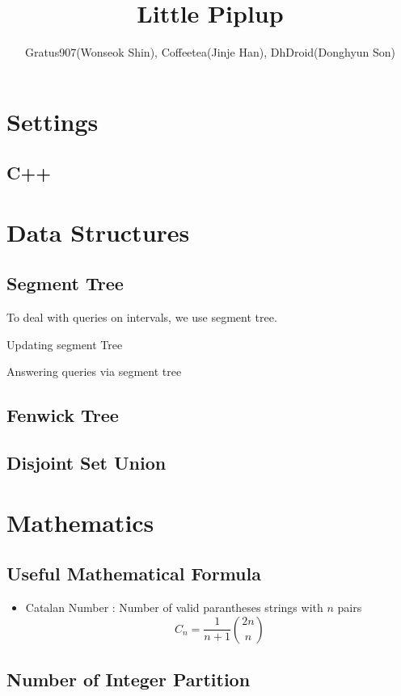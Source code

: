 \documentclass[landscape,8pt]{article}
\title{\Huge{\textsf{Little Piplup}}}
\author{Gratus907(Wonseok Shin), Coffeetea(Jinje Han), DhDroid(Donghyun Son)}
\date{ }
\begin{document}
\maketitle
\begin{multicols}{2}\raggedcolumns
\tableofcontents
\pagebreak

\section{Settings}

  \subsection{C++}

\section{Data Structures}
  \subsection{Segment Tree}
     To deal with queries on intervals, we use segment tree.
     
     Updating segment Tree
     
     Answering queries via segment tree
     
  \subsection{Fenwick Tree}
  \subsection{Disjoint Set Union}
\columnbreak
  \section{Mathematics}
  \subsection{Useful Mathematical Formula}
    \begin{itemize}
      \item Catalan Number : Number of valid parantheses strings with $n$ pairs
      \[
      C_n = \frac{1}{n+1}\binom{2n}{n}
      \]
    \end{itemize}
  \subsection{Number of Integer Partition}
    


\end{multicols}
\end{document}
